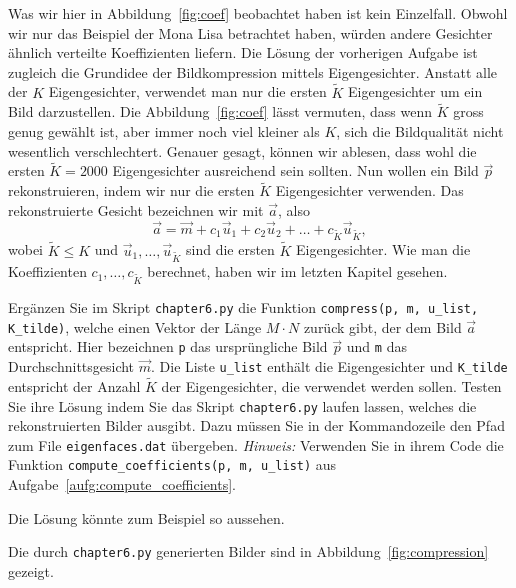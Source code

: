 Was wir hier in Abbildung~\ref{fig:coef} beobachtet haben ist kein Einzelfall.
Obwohl wir nur das Beispiel der Mona Lisa betrachtet haben, würden andere Gesichter ähnlich verteilte Koeffizienten liefern.
Die Lösung der vorherigen Aufgabe ist zugleich die Grundidee der Bildkompression mittels Eigengesichter.
Anstatt alle der $K$ Eigengesichter, verwendet man nur die ersten $\tilde K$ Eigengesichter um ein Bild darzustellen.
Die Abbildung~\ref{fig:coef} lässt vermuten, dass wenn $\tilde K$ gross genug gewählt ist, aber immer noch viel kleiner als $K$, sich die Bildqualität nicht wesentlich verschlechtert.
Genauer gesagt, können wir ablesen, dass wohl die ersten $\tilde K=2000$ Eigengesichter ausreichend sein sollten.
Nun wollen ein Bild $\vec p$ rekonstruieren, indem wir nur die ersten $\tilde K$ Eigengesichter verwenden.
Das rekonstruierte Gesicht bezeichnen wir mit $\vec a$, also
\begin{equation*}
	\vec a=\vec m+c_1\vec u_1+c_2\vec u_2+\ldots+c_{\tilde K}\vec u_{\tilde K},
\end{equation*}
wobei $\tilde K\leq K$ und $\vec u_1,\ldots,\vec u_{\tilde K}$ sind die ersten $\tilde K$ Eigengesichter.
Wie man die Koeffizienten $c_1,\ldots,c_{\tilde K}$ berechnet, haben wir im letzten Kapitel gesehen.
\begin{aufgabe} \label{aufg:compression}
	Ergänzen Sie im Skript \texttt{chapter6.py} die Funktion \texttt{compress(p, m, u\_list, K\_tilde)}, welche einen Vektor der Länge $M\cdot N$ zurück gibt, der dem Bild $\vec a$ entspricht.
	Hier bezeichnen \texttt{p} das ursprüngliche Bild $\vec p$ und \texttt{m} das Durchschnittsgesicht $\vec m$.
	Die Liste \texttt{u\_list} enthält die Eigengesichter und \texttt{K\_tilde} entspricht der Anzahl $\tilde K$ der Eigengesichter, die verwendet werden sollen.
	Testen Sie ihre Lösung indem Sie das Skript \texttt{chapter6.py} laufen lassen, welches die rekonstruierten Bilder ausgibt.
	Dazu müssen Sie in der Kommandozeile den Pfad zum File \texttt{eigenfaces.dat} übergeben.
	\textit{Hinweis:} Verwenden Sie in ihrem Code die Funktion \texttt{compute\_coefficients(p, m, u\_list)} aus Aufgabe~\ref{aufg:compute_coefficients}.
\end{aufgabe}
\begin{losung}
	Die Lösung könnte zum Beispiel so aussehen.

Die durch \texttt{chapter6.py} generierten Bilder sind in Abbildung~\ref{fig:compression} gezeigt.
\end{losung}
